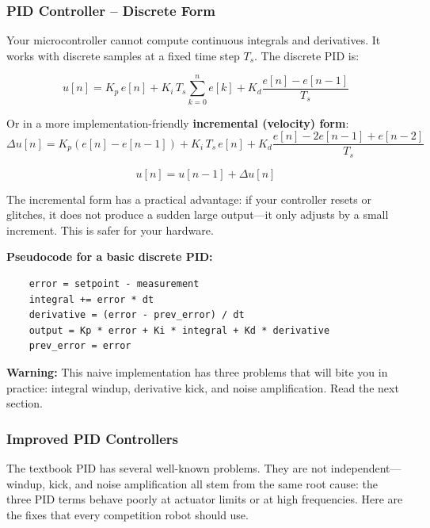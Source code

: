 \subsubsection{PID Controller -- Discrete Form}

Your microcontroller cannot compute continuous integrals and derivatives. It works with discrete samples at a fixed time step $T_s$. The discrete PID is:

\begin{equation}
u[n] = K_p \, e[n] + K_i \, T_s \sum_{k=0}^{n} e[k] + K_d \frac{e[n] - e[n-1]}{T_s}
\end{equation}

Or in a more implementation-friendly \textbf{incremental (velocity) form}:
\begin{equation}
\Delta u[n] = K_p (e[n] - e[n-1]) + K_i \, T_s \, e[n] + K_d \frac{e[n] - 2e[n-1] + e[n-2]}{T_s}
\end{equation}

\begin{equation}
u[n] = u[n-1] + \Delta u[n]
\end{equation}

The incremental form has a practical advantage: if your controller resets or glitches, it does not produce a sudden large output---it only adjusts by a small increment. This is safer for your hardware.

\textbf{Pseudocode for a basic discrete PID:}
\begin{verbatim}
    error = setpoint - measurement
    integral += error * dt
    derivative = (error - prev_error) / dt
    output = Kp * error + Ki * integral + Kd * derivative
    prev_error = error
\end{verbatim}

\textbf{Warning:} This naive implementation has three problems that will bite you in practice: integral windup, derivative kick, and noise amplification. Read the next section.

\subsubsection{Improved PID Controllers}

The textbook PID has several well-known problems. They are not independent---windup, kick, and noise amplification all stem from the same root cause: the three PID terms behave poorly at actuator limits or at high frequencies. Here are the fixes that every competition robot should use.

